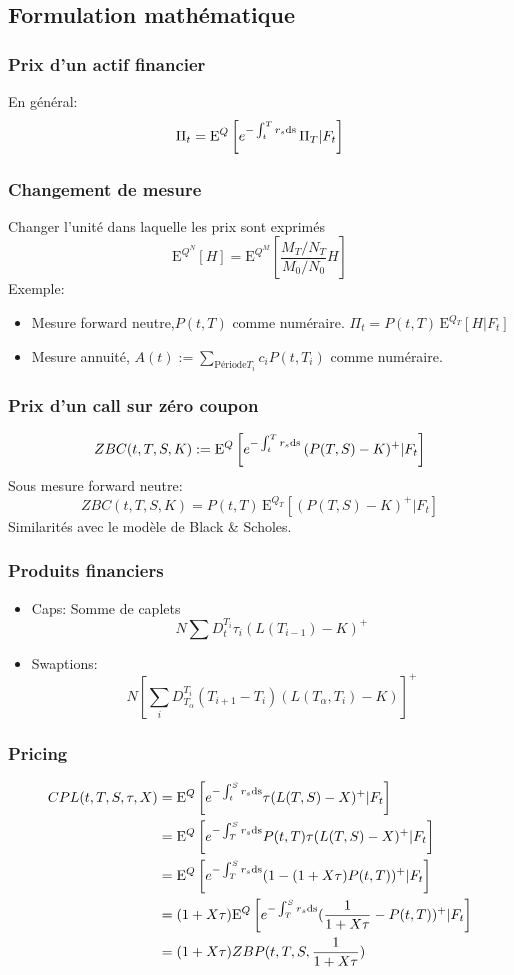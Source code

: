 \documentclass{beamer}
\newcommand{\espr}[1]{
  \mathrm{E}^Q \left[ #1 \right]
}
\newcommand{\Qespr}[2]{
  \mathrm{E}^{#1} \left[ #2 \right]
}
\begin{document}
\subsection{Formulation mathématique}
\begin{frame}
  \frametitle{Prix d'un actif financier}
  En général:
$$ \Pi_t = \espr{ e^{-\int_t^T r_s \rm{d}s} \, \Pi_T | F_t} $$
\end{frame}

\begin{frame}
  \frametitle{Changement de mesure}
  Changer l'unité dans laquelle les prix sont exprimés
  $$\Qespr{Q^N}{ H } = \Qespr{Q^M}{ \frac{ M_T/N_T}{M_0/N_0} H}$$
  Exemple:
  \begin{itemize}
  \item Mesure forward neutre,$P(t, T)$ comme numéraire. $\Pi_t = P(t, T) \, \Qespr{Q_T}{ H | F_t } $
  \item Mesure annuité, $A(t) := \sum\limits_{\text{Période} T_i} c_i P(t, T_i)$ comme numéraire. 
  \end{itemize}
\end{frame}

\begin{frame}
  \frametitle{Prix d'un call sur zéro coupon}
  $$ZBC(t, T, S, K) := \espr{ e^{-\int_t^T r_s \rm{d}s} \, (P(T, S) - K)^+ | F_t }$$
  Sous mesure forward neutre:
  $$ZBC(t, T, S, K) = P(t, T) \, \Qespr{Q_T}{(P(T, S) - K)^+ | F_t}$$
  Similarités avec le modèle de Black \& Scholes.
\end{frame}



\begin{frame}
  \frametitle{Produits financiers}
  \begin{itemize}
  \item Caps: Somme de caplets $$ N \sum D_t^{T_i} \tau_i (L(T_{i-1}) - K)^+ $$
  \item Swaptions: $$ N \left[ \sum_{i} D_{T_{\alpha}}^{T_i} (T_{i+1} - T_i) \left(L(T_{\alpha}, T_i) - K \right) \right]^+$$
  \end{itemize}
\end{frame}

\begin{frame}
  \frametitle{Pricing}
  \begin{align*}
    CPL(t, T, S, \tau, X)
    &= \espr{ e^{-\int_t^S r_s \rm{d}s} \tau (L(T, S) - X)^+ | F_t} \\ 
    &= \espr{ e^{-\int_T^S r_s \rm{d}s} P(t, T)  \tau (L(T, S) - X)^+ | F_t} \\
    &= \espr{ e^{-\int_T^S r_s \rm{d}s} (1 - (1 + X \tau)P(t, T))^+ | F_t} \\
    &= (1 + X \tau) \espr{ e^{-\int_T^S r_s \rm{d}s} (\frac{1}{1 + X \tau} - P(t, T))^+ | F_t} \\
    &= (1+X \tau) ZBP(t, T, S, \frac{1}{1+X \tau})
\end{align*}
\end{frame}
\end{document}
